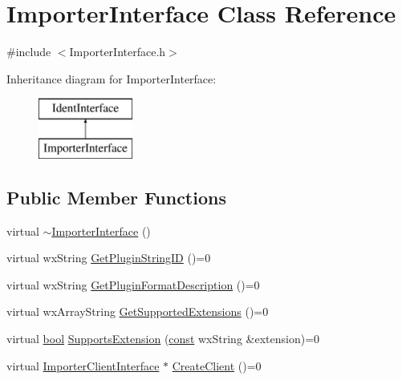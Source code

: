 \hypertarget{class_importer_interface}{}\section{Importer\+Interface Class Reference}
\label{class_importer_interface}


{\ttfamily \#include $<$Importer\+Interface.\+h$>$}

Inheritance diagram for Importer\+Interface\+:\begin{figure}[H]
\begin{center}
\leavevmode
\includegraphics[height=2.000000cm]{class_importer_interface}
\end{center}
\end{figure}
\subsection*{Public Member Functions}
\begin{DoxyCompactItemize}
\item 
virtual \hyperlink{class_importer_interface_ac89a712798b0bb225b761e38aff9ca7c}{$\sim$\+Importer\+Interface} ()
\item 
virtual wx\+String \hyperlink{class_importer_interface_a8dceea3dfca53f8341b05bb74a102e14}{Get\+Plugin\+String\+ID} ()=0
\item 
virtual wx\+String \hyperlink{class_importer_interface_aed11384e5aac315713bd2e1fa5552cbf}{Get\+Plugin\+Format\+Description} ()=0
\item 
virtual wx\+Array\+String \hyperlink{class_importer_interface_af262fbfa6fcc56ec63fb885d1dc7f060}{Get\+Supported\+Extensions} ()=0
\item 
virtual \hyperlink{mac_2config_2i386_2lib-src_2libsoxr_2soxr-config_8h_abb452686968e48b67397da5f97445f5b}{bool} \hyperlink{class_importer_interface_abc4e16cef385add18d11d4fa2da86e43}{Supports\+Extension} (\hyperlink{getopt1_8c_a2c212835823e3c54a8ab6d95c652660e}{const} wx\+String \&extension)=0
\item 
virtual \hyperlink{class_importer_client_interface}{Importer\+Client\+Interface} $\ast$ \hyperlink{class_importer_interface_aafee493d48a651be7351e48746114cc6}{Create\+Client} ()=0
\end{DoxyCompactItemize}


